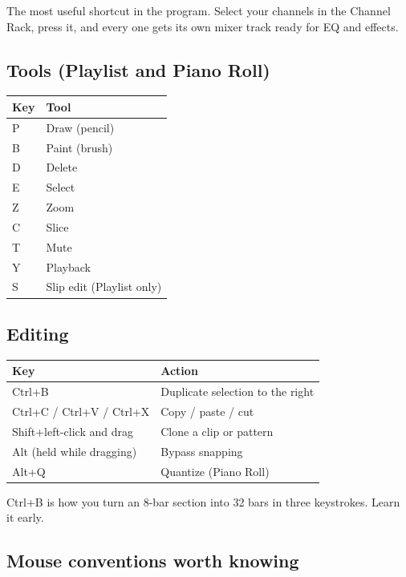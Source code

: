 The most useful shortcut in the program. Select your channels in the Channel Rack, press it,
and every one gets its own mixer track ready for EQ and effects.

\subsection{Tools (Playlist and Piano Roll)}\label{fl04_shortcuts-tools-playlist-and-piano-roll}

{\def\LTcaptype{none} %
\begin{longtable}[]{@{}ll@{}}
\toprule\noalign{}
Key & Tool \\
\midrule\noalign{}
\endhead
\bottomrule\noalign{}
\endlastfoot
P & Draw (pencil) \\
B & Paint (brush) \\
D & Delete \\
E & Select \\
Z & Zoom \\
C & Slice \\
T & Mute \\
Y & Playback \\
S & Slip edit (Playlist only) \\
\end{longtable}
}

\subsection{Editing}\label{fl04_shortcuts-editing}

{\def\LTcaptype{none} %
\begin{longtable}[]{@{}ll@{}}
\toprule\noalign{}
Key & Action \\
\midrule\noalign{}
\endhead
\bottomrule\noalign{}
\endlastfoot
Ctrl+B & Duplicate selection to the right \\
Ctrl+C / Ctrl+V / Ctrl+X & Copy / paste / cut \\
Shift+left-click and drag & Clone a clip or pattern \\
Alt (held while dragging) & Bypass snapping \\
Alt+Q & Quantize (Piano Roll) \\
\end{longtable}
}

Ctrl+B is how you turn an 8-bar section into 32 bars in three keystrokes. Learn it early.

\subsection{Mouse conventions worth knowing}\label{fl04_shortcuts-mouse-conventions-worth-knowing}

